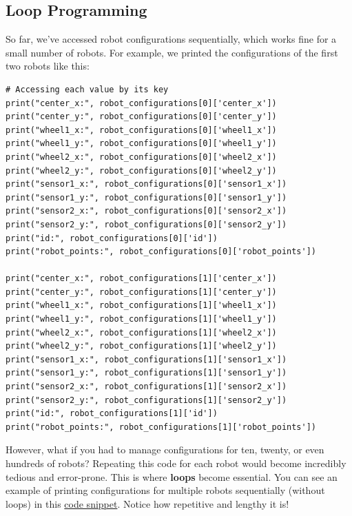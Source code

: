 
\subsection{Loop Programming}

So far, we've accessed robot configurations sequentially, which works fine for a small number of robots. For example, we printed the configurations of the first two robots like this:

\begin{verbatim}
# Accessing each value by its key
print("center_x:", robot_configurations[0]['center_x'])
print("center_y:", robot_configurations[0]['center_y'])
print("wheel1_x:", robot_configurations[0]['wheel1_x'])
print("wheel1_y:", robot_configurations[0]['wheel1_y'])
print("wheel2_x:", robot_configurations[0]['wheel2_x'])
print("wheel2_y:", robot_configurations[0]['wheel2_y'])
print("sensor1_x:", robot_configurations[0]['sensor1_x'])
print("sensor1_y:", robot_configurations[0]['sensor1_y'])
print("sensor2_x:", robot_configurations[0]['sensor2_x'])
print("sensor2_y:", robot_configurations[0]['sensor2_y'])
print("id:", robot_configurations[0]['id'])
print("robot_points:", robot_configurations[0]['robot_points'])

print("center_x:", robot_configurations[1]['center_x'])
print("center_y:", robot_configurations[1]['center_y'])
print("wheel1_x:", robot_configurations[1]['wheel1_x'])
print("wheel1_y:", robot_configurations[1]['wheel1_y'])
print("wheel2_x:", robot_configurations[1]['wheel2_x'])
print("wheel2_y:", robot_configurations[1]['wheel2_y'])
print("sensor1_x:", robot_configurations[1]['sensor1_x'])
print("sensor1_y:", robot_configurations[1]['sensor1_y'])
print("sensor2_x:", robot_configurations[1]['sensor2_x'])
print("sensor2_y:", robot_configurations[1]['sensor2_y'])
print("id:", robot_configurations[1]['id'])
print("robot_points:", robot_configurations[1]['robot_points'])

\end{verbatim}

However, what if you had to manage configurations for ten, twenty, or even hundreds of robots? Repeating this code for each robot would become incredibly tedious and error-prone. This is where \textbf{loops} become essential. You can see an example of printing configurations for multiple robots sequentially (without loops) in this \href{https://github.com/balandongiv/computer_programming_gist/blob/main/session3/print_robot_positions.py}{code snippet}. Notice how repetitive and lengthy it is!


